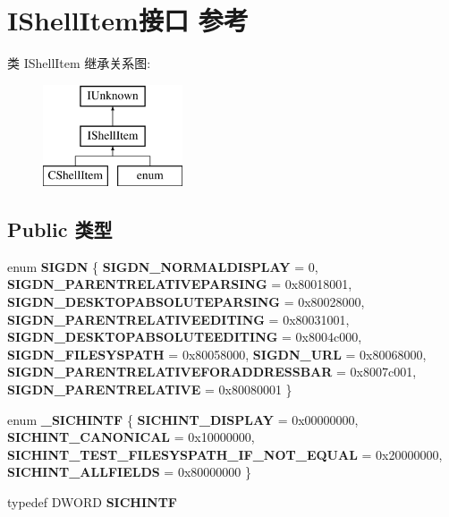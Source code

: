 \hypertarget{interface_i_shell_item}{}\section{I\+Shell\+Item接口 参考}
\label{interface_i_shell_item}
类 I\+Shell\+Item 继承关系图\+:\begin{figure}[H]
\begin{center}
\leavevmode
\includegraphics[height=3.000000cm]{interface_i_shell_item}
\end{center}
\end{figure}
\subsection*{Public 类型}
\begin{DoxyCompactItemize}
\item 
\mbox{\label{interface_i_shell_item_a6c445dca3e72cf6d413c39145da2d591}} 
enum {\bfseries S\+I\+G\+DN} \{ \newline
{\bfseries S\+I\+G\+D\+N\+\_\+\+N\+O\+R\+M\+A\+L\+D\+I\+S\+P\+L\+AY} = 0, 
{\bfseries S\+I\+G\+D\+N\+\_\+\+P\+A\+R\+E\+N\+T\+R\+E\+L\+A\+T\+I\+V\+E\+P\+A\+R\+S\+I\+NG} = 0x80018001, 
{\bfseries S\+I\+G\+D\+N\+\_\+\+D\+E\+S\+K\+T\+O\+P\+A\+B\+S\+O\+L\+U\+T\+E\+P\+A\+R\+S\+I\+NG} = 0x80028000, 
{\bfseries S\+I\+G\+D\+N\+\_\+\+P\+A\+R\+E\+N\+T\+R\+E\+L\+A\+T\+I\+V\+E\+E\+D\+I\+T\+I\+NG} = 0x80031001, 
\newline
{\bfseries S\+I\+G\+D\+N\+\_\+\+D\+E\+S\+K\+T\+O\+P\+A\+B\+S\+O\+L\+U\+T\+E\+E\+D\+I\+T\+I\+NG} = 0x8004c000, 
{\bfseries S\+I\+G\+D\+N\+\_\+\+F\+I\+L\+E\+S\+Y\+S\+P\+A\+TH} = 0x80058000, 
{\bfseries S\+I\+G\+D\+N\+\_\+\+U\+RL} = 0x80068000, 
{\bfseries S\+I\+G\+D\+N\+\_\+\+P\+A\+R\+E\+N\+T\+R\+E\+L\+A\+T\+I\+V\+E\+F\+O\+R\+A\+D\+D\+R\+E\+S\+S\+B\+AR} = 0x8007c001, 
\newline
{\bfseries S\+I\+G\+D\+N\+\_\+\+P\+A\+R\+E\+N\+T\+R\+E\+L\+A\+T\+I\+VE} = 0x80080001
 \}
\item 
\mbox{\label{interface_i_shell_item_a07c640de308ed9efe44c73539e04b406}} 
enum {\bfseries \+\_\+\+S\+I\+C\+H\+I\+N\+TF} \{ {\bfseries S\+I\+C\+H\+I\+N\+T\+\_\+\+D\+I\+S\+P\+L\+AY} = 0x00000000, 
{\bfseries S\+I\+C\+H\+I\+N\+T\+\_\+\+C\+A\+N\+O\+N\+I\+C\+AL} = 0x10000000, 
{\bfseries S\+I\+C\+H\+I\+N\+T\+\_\+\+T\+E\+S\+T\+\_\+\+F\+I\+L\+E\+S\+Y\+S\+P\+A\+T\+H\+\_\+\+I\+F\+\_\+\+N\+O\+T\+\_\+\+E\+Q\+U\+AL} = 0x20000000, 
{\bfseries S\+I\+C\+H\+I\+N\+T\+\_\+\+A\+L\+L\+F\+I\+E\+L\+DS} = 0x80000000
 \}
\item 
\mbox{\label{interface_i_shell_item_a9a6ac950746f67c22d178599cd248c3a}} 
typedef D\+W\+O\+RD {\bfseries S\+I\+C\+H\+I\+N\+TF}
\end{DoxyCompactItemize}
